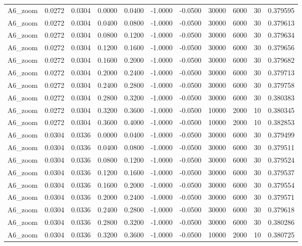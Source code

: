 \documentclass{article}
\begin{document}
\begin{longtable}{l r r r r r r r r r l}
A6_zoom & 0.0272 & 0.0304 & 0.0000 & 0.0400 & -1.0000 & -0.0500 & 30000 & 6000 & 30 & 0.379595 \\
A6_zoom & 0.0272 & 0.0304 & 0.0400 & 0.0800 & -1.0000 & -0.0500 & 30000 & 6000 & 30 & 0.379613 \\
A6_zoom & 0.0272 & 0.0304 & 0.0800 & 0.1200 & -1.0000 & -0.0500 & 30000 & 6000 & 30 & 0.379634 \\
A6_zoom & 0.0272 & 0.0304 & 0.1200 & 0.1600 & -1.0000 & -0.0500 & 30000 & 6000 & 30 & 0.379656 \\
A6_zoom & 0.0272 & 0.0304 & 0.1600 & 0.2000 & -1.0000 & -0.0500 & 30000 & 6000 & 30 & 0.379682 \\
A6_zoom & 0.0272 & 0.0304 & 0.2000 & 0.2400 & -1.0000 & -0.0500 & 30000 & 6000 & 30 & 0.379713 \\
A6_zoom & 0.0272 & 0.0304 & 0.2400 & 0.2800 & -1.0000 & -0.0500 & 30000 & 6000 & 30 & 0.379758 \\
A6_zoom & 0.0272 & 0.0304 & 0.2800 & 0.3200 & -1.0000 & -0.0500 & 30000 & 6000 & 30 & 0.380383 \\
A6_zoom & 0.0272 & 0.0304 & 0.3200 & 0.3600 & -1.0000 & -0.0500 & 10000 & 2000 & 10 & 0.380345 \\
A6_zoom & 0.0272 & 0.0304 & 0.3600 & 0.4000 & -1.0000 & -0.0500 & 10000 & 2000 & 10 & 0.382853 \\
A6_zoom & 0.0304 & 0.0336 & 0.0000 & 0.0400 & -1.0000 & -0.0500 & 30000 & 6000 & 30 & 0.379499 \\
A6_zoom & 0.0304 & 0.0336 & 0.0400 & 0.0800 & -1.0000 & -0.0500 & 30000 & 6000 & 30 & 0.379511 \\
A6_zoom & 0.0304 & 0.0336 & 0.0800 & 0.1200 & -1.0000 & -0.0500 & 30000 & 6000 & 30 & 0.379524 \\
A6_zoom & 0.0304 & 0.0336 & 0.1200 & 0.1600 & -1.0000 & -0.0500 & 30000 & 6000 & 30 & 0.379537 \\
A6_zoom & 0.0304 & 0.0336 & 0.1600 & 0.2000 & -1.0000 & -0.0500 & 30000 & 6000 & 30 & 0.379554 \\
A6_zoom & 0.0304 & 0.0336 & 0.2000 & 0.2400 & -1.0000 & -0.0500 & 30000 & 6000 & 30 & 0.379571 \\
A6_zoom & 0.0304 & 0.0336 & 0.2400 & 0.2800 & -1.0000 & -0.0500 & 30000 & 6000 & 30 & 0.379618 \\
A6_zoom & 0.0304 & 0.0336 & 0.2800 & 0.3200 & -1.0000 & -0.0500 & 30000 & 6000 & 30 & 0.380286 \\
A6_zoom & 0.0304 & 0.0336 & 0.3200 & 0.3600 & -1.0000 & -0.0500 & 10000 & 2000 & 10 & 0.380725 \\

\end{longtable}
\end{document}
